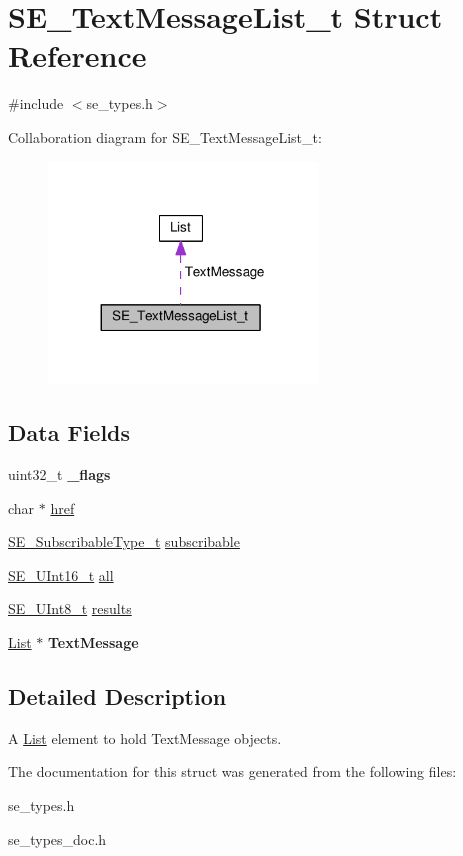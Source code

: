 \hypertarget{structSE__TextMessageList__t}{}\section{S\+E\+\_\+\+Text\+Message\+List\+\_\+t Struct Reference}
\label{structSE__TextMessageList__t}


{\ttfamily \#include $<$se\+\_\+types.\+h$>$}



Collaboration diagram for S\+E\+\_\+\+Text\+Message\+List\+\_\+t\+:\nopagebreak
\begin{figure}[H]
\begin{center}
\leavevmode
\includegraphics[width=203pt]{structSE__TextMessageList__t__coll__graph}
\end{center}
\end{figure}
\subsection*{Data Fields}
\begin{DoxyCompactItemize}
\item 
uint32\+\_\+t {\bfseries \+\_\+flags}
\item 
char $\ast$ \hyperlink{group__TextMessageList_ga20a37c16ba898b155d07ffbabba88d71}{href}
\item 
\hyperlink{group__SubscribableType_ga5c41f553d369710ed34619266bf2551e}{S\+E\+\_\+\+Subscribable\+Type\+\_\+t} \hyperlink{group__TextMessageList_ga4c361e5636bcdbbb0dbf66d4f2ea106e}{subscribable}
\item 
\hyperlink{group__UInt16_gac68d541f189538bfd30cfaa712d20d29}{S\+E\+\_\+\+U\+Int16\+\_\+t} \hyperlink{group__TextMessageList_gae0e3024c0f3f00ac06820200dd03e8f7}{all}
\item 
\hyperlink{group__UInt8_gaf7c365a1acfe204e3a67c16ed44572f5}{S\+E\+\_\+\+U\+Int8\+\_\+t} \hyperlink{group__TextMessageList_ga1ddf4d774f7b963a68dd927dbd8ab2b3}{results}
\item 
\hyperlink{structList}{List} $\ast$ {\bfseries Text\+Message}
\end{DoxyCompactItemize}


\subsection{Detailed Description}
A \hyperlink{structList}{List} element to hold Text\+Message objects. 

The documentation for this struct was generated from the following files\+:\begin{DoxyCompactItemize}
\item 
se\+\_\+types.\+h\item 
se\+\_\+types\+\_\+doc.\+h\end{DoxyCompactItemize}
